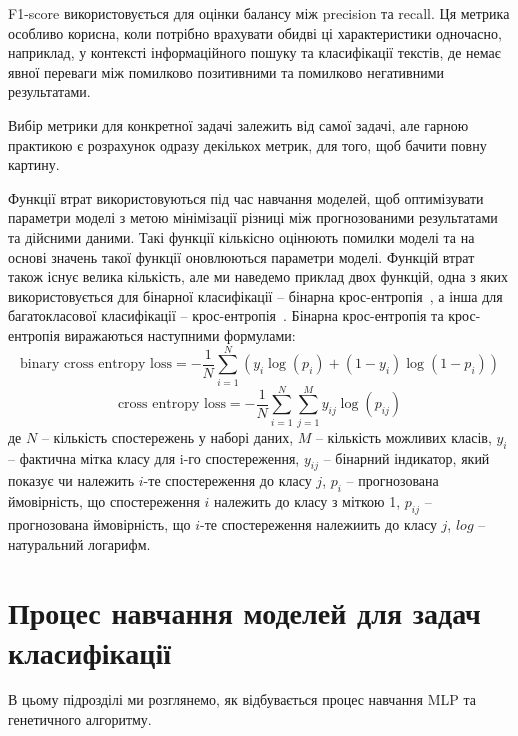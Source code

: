 F1-score використовується для оцінки балансу між precision та recall. Ця метрика особливо корисна, коли потрібно врахувати обидві ці характеристики одночасно, наприклад, у контексті інформаційного пошуку та класифікації текстів, де немає явної переваги між помилково позитивними та помилково негативними результатами.

Вибір метрики для конкретної задачі залежить від самої задачі, але гарною практикою є розрахунок одразу декількох метрик, для того, щоб бачити повну картину.

Функції втрат використовуються під час навчання моделей, щоб оптимізувати параметри моделі з метою мінімізації різниці між прогнозованими результатами та дійсними даними. Такі функції кількісно оцінюють помилки моделі та на основі значень такої функції оновлюються параметри моделі. Функцій втрат також існує велика кількість, але ми наведемо приклад двох функцій, одна з яких використовується для бінарної класифікації -- бінарна крос-ентропія~\cite{ct27}, а інша для багатокласової класифікації -- крос-ентропія~\cite{ct28}. Бінарна крос-ентропія та крос-ентропія виражаються наступними формулами:
\begin{equation}
	\label{eq:binary_cross_entropy}
	\text{binary cross entropy loss} = -\frac{1}{N} \sum_{i=1}^{N} \left( y_i \log(p_i) + (1 - y_i) \log(1 - p_i) \right)
\end{equation}
\begin{equation}
	\label{eq:cross_entropy}
	\text{cross entropy loss} = -\frac{1}{N} \sum_{i=1}^{N} \sum_{j=1}^{M} y_{ij} \log(p_{ij})
\end{equation}
де $N$ -- кількість спостережень у наборі даних, $M$ -- кількість можливих класів, $y_i$ -- фактична мітка класу для i-го спостереження, $y_{ij}$ -- бінарний індикатор, який показує чи належить $i$-те спостереження до класу $j$, $p_i$ -- прогнозована ймовірність, що спостереження $i$ належить до класу з міткою 1, $p_{ij}$ -- прогнозована ймовірність, що $i$-те спостереження належиить до класу $j$, $log$ -- натуральний логарифм.

\section{Процес навчання моделей для задач класифікації}\label{sec:training_process}


В цьому підрозділі ми розглянемо, як відбувається процес навчання MLP та генетичного алгоритму.

